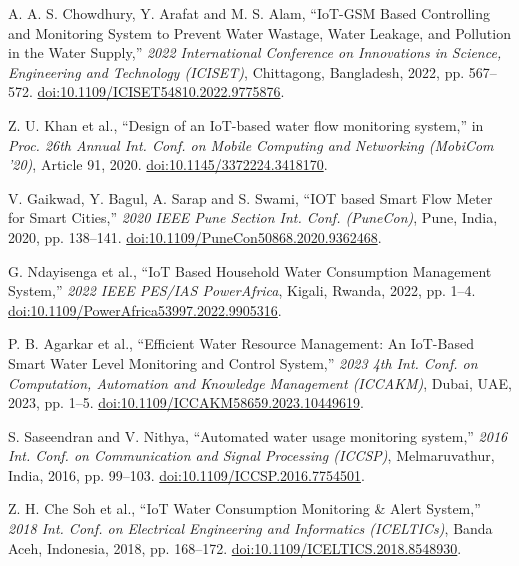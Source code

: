 \documentclass[conference]{IEEEtran}
\begin{document}
\begin{thebibliography}{99}

    A. A. S. Chowdhury, Y. Arafat and M. S. Alam, ``IoT-GSM Based Controlling and Monitoring System to Prevent Water Wastage, Water Leakage, and Pollution in the Water Supply,'' \textit{2022 International Conference on Innovations in Science, Engineering and Technology (ICISET)}, Chittagong, Bangladesh, 2022, pp. 567–572. \href{https://doi.org/10.1109/ICISET54810.2022.9775876}{doi:10.1109/ICISET54810.2022.9775876}.

    Z. U. Khan et al., ``Design of an IoT-based water flow monitoring system,'' in \textit{Proc. 26th Annual Int. Conf. on Mobile Computing and Networking (MobiCom '20)}, Article 91, 2020. \href{https://doi.org/10.1145/3372224.3418170}{doi:10.1145/3372224.3418170}.

    V. Gaikwad, Y. Bagul, A. Sarap and S. Swami, ``IOT based Smart Flow Meter for Smart Cities,'' \textit{2020 IEEE Pune Section Int. Conf. (PuneCon)}, Pune, India, 2020, pp. 138–141. \href{https://doi.org/10.1109/PuneCon50868.2020.9362468}{doi:10.1109/PuneCon50868.2020.9362468}.

    G. Ndayisenga et al., ``IoT Based Household Water Consumption Management System,'' \textit{2022 IEEE PES/IAS PowerAfrica}, Kigali, Rwanda, 2022, pp. 1–4. \href{https://doi.org/10.1109/PowerAfrica53997.2022.9905316}{doi:10.1109/PowerAfrica53997.2022.9905316}.

    P. B. Agarkar et al., ``Efficient Water Resource Management: An IoT-Based Smart Water Level Monitoring and Control System,'' \textit{2023 4th Int. Conf. on Computation, Automation and Knowledge Management (ICCAKM)}, Dubai, UAE, 2023, pp. 1–5. \href{https://doi.org/10.1109/ICCAKM58659.2023.10449619}{doi:10.1109/ICCAKM58659.2023.10449619}.

    S. Saseendran and V. Nithya, ``Automated water usage monitoring system,'' \textit{2016 Int. Conf. on Communication and Signal Processing (ICCSP)}, Melmaruvathur, India, 2016, pp. 99–103. \href{https://doi.org/10.1109/ICCSP.2016.7754501}{doi:10.1109/ICCSP.2016.7754501}.

    Z. H. Che Soh et al., ``IoT Water Consumption Monitoring \& Alert System,'' \textit{2018 Int. Conf. on Electrical Engineering and Informatics (ICELTICs)}, Banda Aceh, Indonesia, 2018, pp. 168–172. \href{https://doi.org/10.1109/ICELTICS.2018.8548930}{doi:10.1109/ICELTICS.2018.8548930}.


\end{thebibliography}
\end{document}
